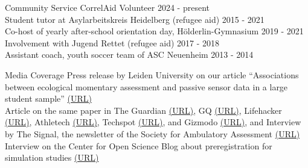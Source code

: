 \documentclass{resume} %
\begin{document}

\begin{rSection}{Community Service}
CorrelAid Volunteer \hfill 2024 - present \\
Student tutor at Asylarbeitskreis Heidelberg (refugee aid) \hfill 2015 - 2021 \\
Co-host of yearly after-school orientation day, Hölderlin-Gymnasium \hfill 2019 - 2021\\
Involvement with Jugend Rettet (refugee aid) \hfill 2017 - 2018\\
Assistant coach, youth soccer team of ASC Neuenheim \hfill 2013 - 2014

\end{rSection}

\begin{rSection}{Media Coverage}
Press release by Leiden University on our article ``Associations between ecological momentary assessment and passive sensor data in a large student sample'' \href{https://www.universiteitleiden.nl/en/news/2025/07/does-your-smartwatch-say-youre-stressed-it-may-often-be-wrong}{\textcolor{linkblue}{(URL)}} \\
Article on the same paper in The Guardian \href{https://www.theguardian.com/technology/2025/aug/08/smartwatches-offer-little-insight-into-stress-levels-researchers-find}{\textcolor{linkblue}{(URL)}}, GQ \href{https://www.gq.com/story/can-a-wearable-make-you-happier-with-mood-tracking}{\textcolor{linkblue}{(URL)}}, Lifehacker \href{https://lifehacker.com/health/your-smartwatch-doesnt-actually-know-how-stressed-you-are}{\textcolor{linkblue}{(URL)}}, Athletech \href{https://athletechnews.com/smartwatch-stress-scores-rarely-match-reality-researchers-say/}{\textcolor{linkblue}{(URL)}}, Techspot \href{https://www.techspot.com/news/109027-smartwatches-useless-measuring-actual-stress-levels-study.html}{\textcolor{linkblue}{(URL)}}, and Gizmodo \href{https://gizmodo.com/new-study-finds-smartwatches-arent-that-good-at-measuring-stress-2000640868}{\textcolor{linkblue}{(URL)}}, and Interview by The Signal, the newsletter of the Society for Ambulatory Assessment \href{https://ambulatory-assessment.org/newsletter-december-2025/}{\textcolor{linkblue}{(URL)}}\\
Interview on the Center for Open Science Blog about preregistration for simulation studies \href{https://www.cos.io/blog/introducing-the-simulation-studies-preregistration-template}{\textcolor{linkblue}{(URL)}}

\end{rSection}
\end{document}
